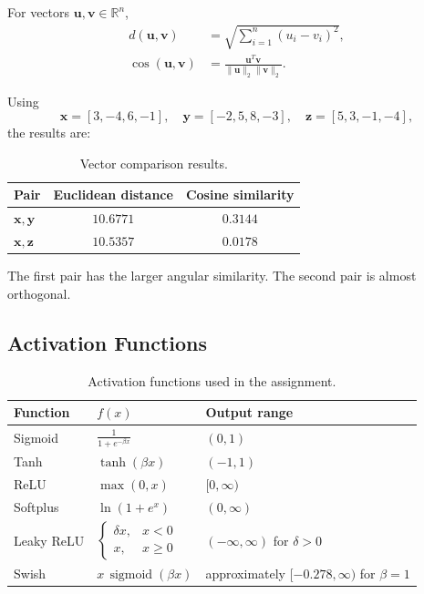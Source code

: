 \documentclass[11pt,a4paper]{article}
\newcommand{\sigmoid}{\operatorname{sigmoid}}
\begin{document}
For vectors $\mathbf{u},\mathbf{v}\in\mathbb{R}^{n}$,
\begin{align}
    d(\mathbf{u},\mathbf{v})
    &=\sqrt{\sum_{i=1}^{n}(u_i-v_i)^2}, \\
    \cos(\mathbf{u},\mathbf{v})
    &=\frac{\mathbf{u}^{T}\mathbf{v}}
    {\lVert\mathbf{u}\rVert_2\lVert\mathbf{v}\rVert_2}.
\end{align}

Using
\[
\mathbf{x}=[3,-4,6,-1],\quad
\mathbf{y}=[-2,5,8,-3],\quad
\mathbf{z}=[5,3,-1,-4],
\]
the results are:

\begin{table}[H]
\centering
\caption{Vector comparison results.}
\begin{tabular}{lcc}
\toprule
Pair & Euclidean distance & Cosine similarity \\
\midrule
$\mathbf{x},\mathbf{y}$ & $10.6771$ & $0.3144$ \\
$\mathbf{x},\mathbf{z}$ & $10.5357$ & $0.0178$ \\
\bottomrule
\end{tabular}
\end{table}

The first pair has the larger angular similarity. The second pair is almost orthogonal.

\subsection{Activation Functions}

\begin{table}[H]
\centering
\small
\caption{Activation functions used in the assignment.}
\begin{tabular}{>{\raggedright\arraybackslash}p{2.3cm}p{4.8cm}p{4.7cm}}
\toprule
Function & $f(x)$ & Output range \\
\midrule
Sigmoid & $\displaystyle \frac{1}{1+e^{-\beta x}}$ & $(0,1)$ \\
Tanh & $\tanh(\beta x)$ & $(-1,1)$ \\
ReLU & $\max(0,x)$ & $[0,\infty)$ \\
Softplus & $\ln(1+e^x)$ & $(0,\infty)$ \\
Leaky ReLU & $\begin{cases}\delta x,&x<0\\x,&x\geq0\end{cases}$ & $(-\infty,\infty)$ for $\delta>0$ \\
Swish & $x\,\sigmoid(\beta x)$ & approximately $[-0.278,\infty)$ for $\beta=1$ \\
\bottomrule
\end{tabular}
\end{table}
\end{document}

